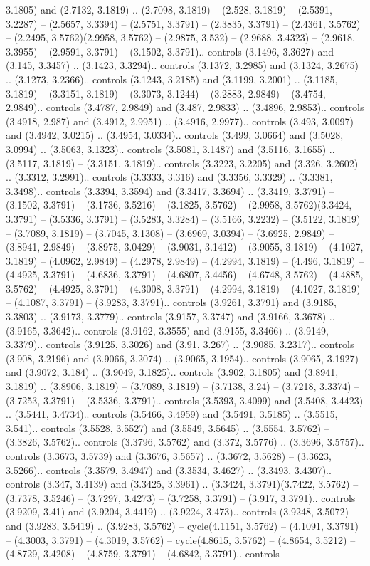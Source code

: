 3.1805) and (2.7132, 3.1819) .. (2.7098, 3.1819) -- (2.528, 3.1819) -- (2.5391, 3.2287) -- (2.5657, 3.3394) -- (2.5751, 3.3791) -- (2.3835, 3.3791) -- (2.4361, 3.5762) -- (2.2495, 3.5762)(2.9958, 3.5762) -- (2.9875, 3.532) -- (2.9688, 3.4323) -- (2.9618, 3.3955) -- (2.9591, 3.3791) -- (3.1502, 3.3791).. controls (3.1496, 3.3627) and (3.145, 3.3457) .. (3.1423, 3.3294).. controls (3.1372, 3.2985) and (3.1324, 3.2675) .. (3.1273, 3.2366).. controls (3.1243, 3.2185) and (3.1199, 3.2001) .. (3.1185, 3.1819) -- (3.3151, 3.1819) -- (3.3073, 3.1244) -- (3.2883, 2.9849) -- (3.4754, 2.9849).. controls (3.4787, 2.9849) and (3.487, 2.9833) .. (3.4896, 2.9853).. controls (3.4918, 2.987) and (3.4912, 2.9951) .. (3.4916, 2.9977).. controls (3.493, 3.0097) and (3.4942, 3.0215) .. (3.4954, 3.0334).. controls (3.499, 3.0664) and (3.5028, 3.0994) .. (3.5063, 3.1323).. controls (3.5081, 3.1487) and (3.5116, 3.1655) .. (3.5117, 3.1819) -- (3.3151, 3.1819).. controls (3.3223, 3.2205) and (3.326, 3.2602) .. (3.3312, 3.2991).. controls (3.3333, 3.316) and (3.3356, 3.3329) .. (3.3381, 3.3498).. controls (3.3394, 3.3594) and (3.3417, 3.3694) .. (3.3419, 3.3791) -- (3.1502, 3.3791) -- (3.1736, 3.5216) -- (3.1825, 3.5762) -- (2.9958, 3.5762)(3.3424, 3.3791) -- (3.5336, 3.3791) -- (3.5283, 3.3284) -- (3.5166, 3.2232) -- (3.5122, 3.1819) -- (3.7089, 3.1819) -- (3.7045, 3.1308) -- (3.6969, 3.0394) -- (3.6925, 2.9849) -- (3.8941, 2.9849) -- (3.8975, 3.0429) -- (3.9031, 3.1412) -- (3.9055, 3.1819) -- (4.1027, 3.1819) -- (4.0962, 2.9849) -- (4.2978, 2.9849) -- (4.2994, 3.1819) -- (4.496, 3.1819) -- (4.4925, 3.3791) -- (4.6836, 3.3791) -- (4.6807, 3.4456) -- (4.6748, 3.5762) -- (4.4885, 3.5762) -- (4.4925, 3.3791) -- (4.3008, 3.3791) -- (4.2994, 3.1819) -- (4.1027, 3.1819) -- (4.1087, 3.3791) -- (3.9283, 3.3791).. controls (3.9261, 3.3791) and (3.9185, 3.3803) .. (3.9173, 3.3779).. controls (3.9157, 3.3747) and (3.9166, 3.3678) .. (3.9165, 3.3642).. controls (3.9162, 3.3555) and (3.9155, 3.3466) .. (3.9149, 3.3379).. controls (3.9125, 3.3026) and (3.91, 3.267) .. (3.9085, 3.2317).. controls (3.908, 3.2196) and (3.9066, 3.2074) .. (3.9065, 3.1954).. controls (3.9065, 3.1927) and (3.9072, 3.184) .. (3.9049, 3.1825).. controls (3.902, 3.1805) and (3.8941, 3.1819) .. (3.8906, 3.1819) -- (3.7089, 3.1819) -- (3.7138, 3.24) -- (3.7218, 3.3374) -- (3.7253, 3.3791) -- (3.5336, 3.3791).. controls (3.5393, 3.4099) and (3.5408, 3.4423) .. (3.5441, 3.4734).. controls (3.5466, 3.4959) and (3.5491, 3.5185) .. (3.5515, 3.541).. controls (3.5528, 3.5527) and (3.5549, 3.5645) .. (3.5554, 3.5762) -- (3.3826, 3.5762).. controls (3.3796, 3.5762) and (3.372, 3.5776) .. (3.3696, 3.5757).. controls (3.3673, 3.5739) and (3.3676, 3.5657) .. (3.3672, 3.5628) -- (3.3623, 3.5266).. controls (3.3579, 3.4947) and (3.3534, 3.4627) .. (3.3493, 3.4307).. controls (3.347, 3.4139) and (3.3425, 3.3961) .. (3.3424, 3.3791)(3.7422, 3.5762) -- (3.7378, 3.5246) -- (3.7297, 3.4273) -- (3.7258, 3.3791) -- (3.917, 3.3791).. controls (3.9209, 3.41) and (3.9204, 3.4419) .. (3.9224, 3.473).. controls (3.9248, 3.5072) and (3.9283, 3.5419) .. (3.9283, 3.5762) -- cycle(4.1151, 3.5762) -- (4.1091, 3.3791) -- (4.3003, 3.3791) -- (4.3019, 3.5762) -- cycle(4.8615, 3.5762) -- (4.8654, 3.5212) -- (4.8729, 3.4208) -- (4.8759, 3.3791) -- (4.6842, 3.3791).. controls 